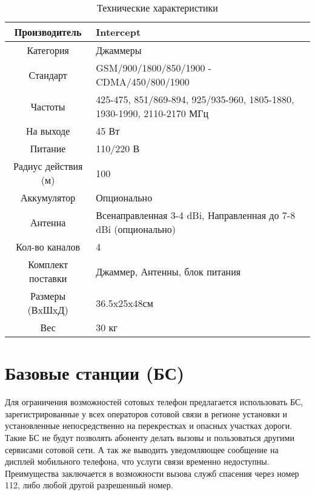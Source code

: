\documentclass{article}
\begin{document}
	\begin{table}[ht]
	\caption{Технические характеристики}
	\label{tbl:TTX}
	\centering
		\begin{tabular}{|c|l|}
			\hline
			Производитель       & Intercept                                                              \\ \hline
			Категория           & Джаммеры                                                               \\ \hline
			Стандарт            & GSM/900/1800/850/1900 - CDMA/450/800/1900                              \\ \hline
			Частоты             & 425-475, 851/869-894, 925/935-960, 1805-1880, 1930-1990, 2110-2170 МГц \\ \hline
			На выходе           & 45 Вт                                                                  \\ \hline
			Питание             & 110/220 В                                                              \\ \hline
			Радиус действия (м) & 100                                                                    \\ \hline
			Аккумулятор         & Опционально                                                            \\ \hline
			Антенна             & Всенаправленная 3-4 dBi, Направленная до 7-8 dBi (опционально)         \\ \hline
			Кол-во каналов      & 4                                                                      \\ \hline
			Комплект поставки   & Джаммер, Антенны, блок питания                                         \\ \hline
			Размеры (ВxШxД)     & 36.5x25x48см                                                           \\ \hline
			Вес                 & 30 кг                                                                  \\ \hline
		\end{tabular}
	\end{table}

	\section{Базовые станции (БС)}

	Для ограничения возможностей сотовых телефон предлагается использовать БС, зарегистрированные у всех операторов сотовой связи в регионе установки и установленные непосредственно на перекрестках и опасных участках дороги. Такие БС не будут позволять абоненту делать вызовы и пользоваться другими сервисами сотовой сети. А так же выводить уведомляющее сообщение на дисплей мобильного телефона, что услуги связи временно недоступны. Преимущества заключается в возможности вызова служб спасения через номер 112, либо любой другой разрешенный номер.
\end{document}

